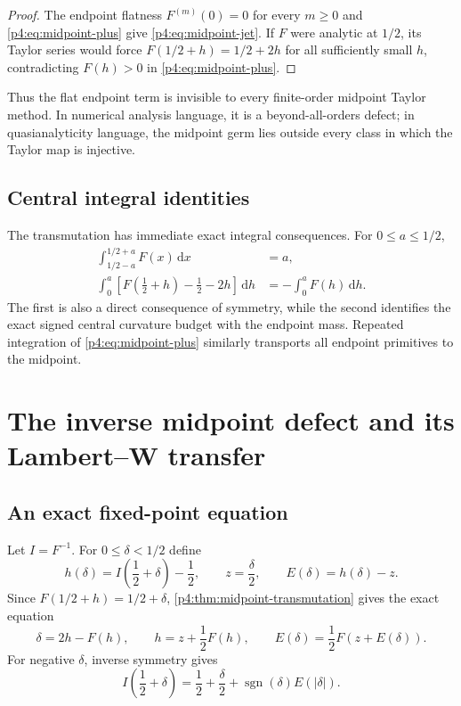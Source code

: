 \documentclass[11pt]{article}
\numberwithin{equation}{section}
\theoremstyle{definition}
\theoremstyle{remark}
\DeclareMathOperator{\sgn}{sgn}
\newcommand{\dd}{\,\mathrm d}
\begin{document}
\begin{proof}
The endpoint flatness $F^{(m)}(0)=0$ for every $m\ge0$ and \eqref{p4:eq:midpoint-plus} give \eqref{p4:eq:midpoint-jet}.  If $F$ were analytic at $1/2$, its Taylor series would force
$F(1/2+h)=1/2+2h$ for all sufficiently small $h$, contradicting $F(h)>0$ in \eqref{p4:eq:midpoint-plus}.
\end{proof}

Thus the flat endpoint term is invisible to every finite-order midpoint Taylor method.  In numerical analysis language, it is a beyond-all-orders defect; in quasianalyticity language, the midpoint germ lies outside every class in which the Taylor map is injective.

\subsection{Central integral identities}
The transmutation has immediate exact integral consequences.  For $0\le a\le1/2$,
\begin{align}
 \int_{1/2-a}^{1/2+a}F(x)\dd x&=a,
 \label{p4:eq:central-mass}\\
 \int_0^a\left[F\!\left(\frac12+h\right)-\frac12-2h\right]\dd h
 &=-\int_0^aF(h)\dd h.
 \label{p4:eq:central-defect-integral}
\end{align}
The first is also a direct consequence of symmetry, while the second identifies the exact signed central curvature budget with the endpoint mass.  Repeated integration of \eqref{p4:eq:midpoint-plus} similarly transports all endpoint primitives to the midpoint.

\section{The inverse midpoint defect and its Lambert--W transfer}
\label{p4:sec:inverse-midpoint}

\subsection{An exact fixed-point equation}
Let $I=F^{-1}$.  For $0\le\delta<1/2$ define
\begin{equation}
 h(\delta)=I\!\left(\frac12+\delta\right)-\frac12,
 \qquad z=\frac\delta2,
 \qquad E(\delta)=h(\delta)-z.
 \label{p4:eq:inverse-definitions}
\end{equation}
Since $F(1/2+h)=1/2+\delta$, \cref{p4:thm:midpoint-transmutation} gives the exact equation
\begin{equation}
 \delta=2h-F(h),
 \qquad
 h=z+\frac12F(h),
 \qquad
 E(\delta)=\frac12F(z+E(\delta)).
 \label{p4:eq:inverse-fixed-point}
\end{equation}
For negative $\delta$, inverse symmetry gives
\begin{equation}
 I\!\left(\frac12+\delta\right)
 =\frac12+\frac\delta2+\sgn(\delta)E(|\delta|).
 \label{p4:eq:inverse-odd-defect}
\end{equation}
\end{document}
